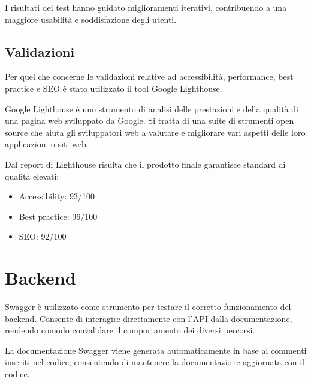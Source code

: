   I risultati dei test hanno guidato miglioramenti iterativi, contribuendo a una maggiore usabilità e soddisfazione degli utenti.

\subsection{Validazioni}

Per quel che concerne le validazioni relative ad accessibilità, performance, best practice e SEO è stato utilizzato il tool Google Lighthouse.

Google Lighthouse è uno strumento di analisi delle prestazioni e della qualità di una pagina web sviluppato da Google. Si tratta di una suite di strumenti open source che aiuta gli sviluppatori web a valutare e migliorare vari aspetti delle loro applicazioni o siti web.

Dal report di Lighthouse\cite{lighthouse} risulta che il prodotto finale garantisce standard di qualità elevati:

\begin{itemize}
  \item Accessibility: 93/100
  \item Best practice: 96/100
  \item SEO: 92/100
\end{itemize}

\section{Backend}
Swagger è utilizzato come strumento per testare il corretto funzionamento del backend. Consente di interagire direttamente con l'API dalla documentazione, rendendo comodo convalidare il comportamento dei diversi percorsi.

La documentazione Swagger viene generata automaticamente in base ai commenti inseriti nel codice, consentendo di mantenere la documentazione aggiornata con il codice.